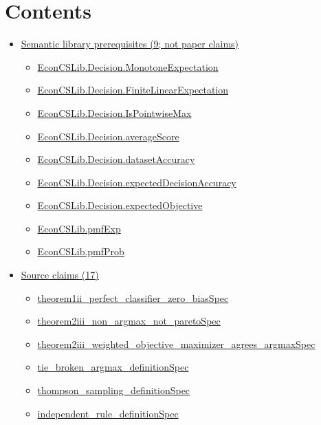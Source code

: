 \documentclass[10pt]{article}
\begin{document}
\section*{Contents}
\begin{itemize}[leftmargin=1.2em]
\item \hyperlink{library-section-62111921f3668458}{Semantic library prerequisites (9; not paper claims)}
\begin{itemize}[leftmargin=1.2em]
\item \hyperlink{library-prerequisite-1ba21d6a145843fe}{EconCSLib.Decision.MonotoneExpectation}
\item \hyperlink{library-prerequisite-d23d58c11a4ba279}{EconCSLib.Decision.FiniteLinearExpectation}
\item \hyperlink{library-prerequisite-cf8d30fbaa7eab2a}{EconCSLib.Decision.IsPointwiseMax}
\item \hyperlink{library-prerequisite-aeeb723ddae150e9}{EconCSLib.Decision.averageScore}
\item \hyperlink{library-prerequisite-d8de4d5952ae79e0}{EconCSLib.Decision.datasetAccuracy}
\item \hyperlink{library-prerequisite-e0ab839a0c73984a}{EconCSLib.Decision.expectedDecisionAccuracy}
\item \hyperlink{library-prerequisite-5f9b15d72189cab5}{EconCSLib.Decision.expectedObjective}
\item \hyperlink{library-prerequisite-e5c7eedc40c11b7a}{EconCSLib.pmfExp}
\item \hyperlink{library-prerequisite-7fec9dedef722fc8}{EconCSLib.pmfProb}
\end{itemize}
\item \hyperlink{source-section-f10b5f68e4acf3dc}{Source claims (17)}
\begin{itemize}[leftmargin=1.2em]
\item \hyperlink{source-claim-1966e78967344232}{theorem1ii\_perfect\_classifier\_zero\_biasSpec}
\item \hyperlink{source-claim-94d82572ce30633e}{theorem2iii\_non\_argmax\_not\_paretoSpec}
\item \hyperlink{source-claim-9ffb824c48c4cf97}{theorem2iii\_weighted\_objective\_maximizer\_agrees\_argmaxSpec}
\item \hyperlink{source-claim-e99b78e6cf17d423}{tie\_broken\_argmax\_definitionSpec}
\item \hyperlink{source-claim-4bfc3aed59b0dc06}{thompson\_sampling\_definitionSpec}
\item \hyperlink{source-claim-4822dab29e865f72}{independent\_rule\_definitionSpec}

\end{itemize}
\end{itemize}
\end{document}
